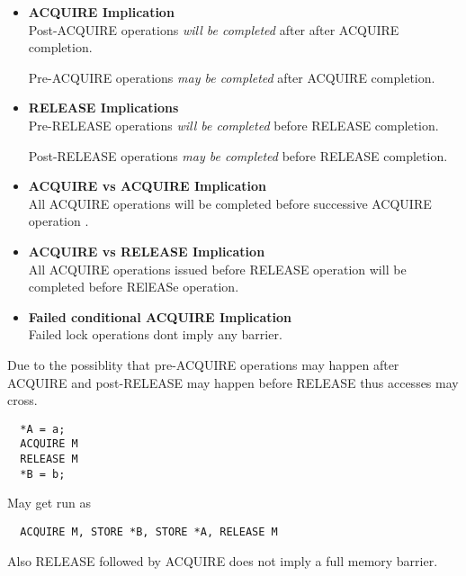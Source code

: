 \documentclass{article}
\begin{document}
\begin{itemize}
  
\item \textbf{ACQUIRE Implication} \\

  Post-ACQUIRE operations \emph{will be completed} after after ACQUIRE
  completion.

  Pre-ACQUIRE operations \emph{may be completed} after ACQUIRE
  completion.
  
\item \textbf{RELEASE Implications} \\

  Pre-RELEASE operations \emph{will be completed} before RELEASE
  completion.

  Post-RELEASE operations \emph{may be completed} before RELEASE
  completion.

\item \textbf{ACQUIRE vs ACQUIRE Implication} \\

  All ACQUIRE operations will be completed before successive ACQUIRE
  operation .

\item \textbf{ACQUIRE vs RELEASE Implication} \\

  All ACQUIRE operations issued before RELEASE operation will be
  completed before RElEASe operation.

\item \textbf{Failed conditional ACQUIRE Implication} \\

  Failed lock operations dont imply any barrier.
  
\end{itemize}

Due to the possiblity that pre-ACQUIRE operations may happen after
ACQUIRE and post-RELEASE may happen before RELEASE thus accesses may
cross.

\begin{lstlisting}
  *A = a;
  ACQUIRE M
  RELEASE M
  *B = b;
\end{lstlisting}

May get run as

\begin{lstlisting}
  ACQUIRE M, STORE *B, STORE *A, RELEASE M
\end{lstlisting}

Also RELEASE followed by ACQUIRE does not imply a full memory barrier.
\end{document}
